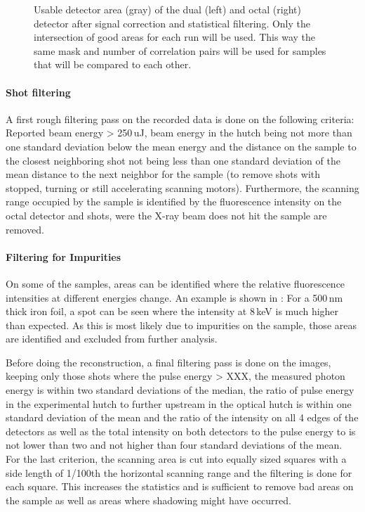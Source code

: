 \begin{figure}
\begin{subfigure}{0.2\textwidth}
	\end{subfigure}
	\caption[Usable detector area]{Usable detector area (gray) of the dual (left) and octal (right) detector after signal correction and statistical filtering. Only the intersection of good areas for each run will be used. This way the same mask and number of correlation pairs will be used for samples that will be compared to each other.}	
\end{figure}

\paragraph{Shot filtering}
A first rough filtering pass on the recorded data is done on the following criteria: Reported beam energy > 250\,uJ, beam energy in the hutch being not more than one standard deviation below the mean energy and the distance on the sample to the closest neighboring shot not being less than one standard deviation of the mean distance to the next neighbor for the sample (to remove shots with stopped, turning or still accelerating scanning motors). Furthermore, the scanning range occupied by the sample is identified by the fluorescence intensity on the octal detector and shots, were the X-ray beam does not hit the sample are removed.

 
\paragraph{Filtering for Impurities}
On some of the samples, areas can be identified where the relative fluorescence intensities at different energies change. An example is shown in : For a 500\,nm thick iron foil, a spot can be seen where the intensity at 8\,keV is much higher than expected. As this is most likely due to impurities on the sample, those areas are identified and excluded from further analysis.

Before doing the reconstruction, a final filtering pass is done on the images, keeping only those shots where the pulse energy > XXX, the measured photon energy is within two standard deviations of the median,
the ratio of pulse energy in the experimental hutch to further upstream in the optical hutch is within one standard deviation of the mean and the ratio of the intensity on all 4 edges of the detectors as well as  the total intensity on both detectors  to the pulse energy to is not lower than two and not higher than four standard deviations of the mean.
For the last criterion, the scanning area is cut into equally sized squares with a side length of 1/100th the horizontal scanning range and the filtering is done for each square. This increases the statistics and is sufficient to remove bad areas on the sample as well as areas where shadowing might have occurred.

